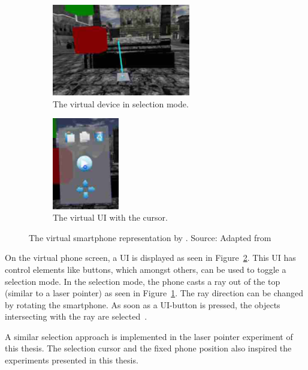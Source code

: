 \begin{figure}[H]
	\centering
	\begin{subfigure}[t]{0.45\textwidth}%
		\centering%
		\includegraphics[height=4cm]{figures/related_work/steed_2013_laser_pointer.png}
		\caption{The virtual device in selection mode.}\label{fig:steed-2013-laser-pointer}%
	\end{subfigure}%
	\hspace{0.1\textwidth}%
	\begin{subfigure}[t]{0.45\textwidth}%
		\centering%
		\includegraphics[height=4cm]{figures/related_work/steed_2013_ui.png}
		\caption{The virtual \gls{UI} with the cursor.}\label{fig:steed-2013-ui}
	\end{subfigure}%
  \caption[Virtual smartphone representation by Steed et al.\@]{The virtual smartphone representation by \citeauthor{Steed.2013}.
  \newline{}
  Source: Adapted from~\protect\cite[Figure 1]{Steed.2013}
  }\label{fig:steed-2013}
\end{figure}

On the virtual phone screen, a \gls{UI} is displayed as seen in Figure~\ref{fig:steed-2013-ui}. This \gls{UI} has control elements like buttons, which amongst others, can be used to toggle a selection mode. In the selection mode, the phone casts a ray out of the top (similar to a laser pointer) as seen in Figure~\ref{fig:steed-2013-laser-pointer}. The ray direction can be changed by rotating the smartphone. As soon as a \gls{UI}-button is pressed, the objects intersecting with the ray are selected~\cite{Steed.2013}.

A similar selection approach is implemented in the laser pointer experiment of this thesis. The selection cursor and the fixed phone position also inspired the experiments presented in this thesis.



